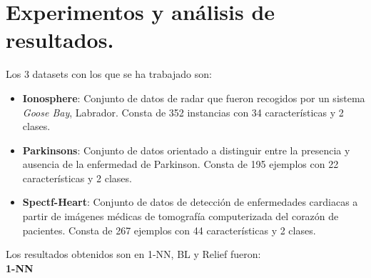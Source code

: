 \documentclass[11pt,a4paper]{article}
\theoremstyle{definition}
\begin{document}
	\section{Experimentos y análisis de resultados.}
	Los 3 datasets con los que se ha trabajado son:
	\begin{itemize}
		\item \textbf{Ionosphere}: Conjunto de datos de radar que fueron recogidos por un sistema \textit{Goose Bay}, Labrador. Consta de 352 instancias con 34 características y 2 clases.
		\item \textbf{Parkinsons}: Conjunto de datos orientado a distinguir entre la presencia y ausencia de la enfermedad de Parkinson. Consta de 195 ejemplos con 22 características y 2 clases.
		\item \textbf{Spectf-Heart}: Conjunto de datos de detección de enfermedades cardiacas a partir de imágenes médicas de tomografía computerizada del corazón de pacientes. Consta de 267 ejemplos con 44 características y 2 clases.
	\end{itemize}
	
	Los resultados obtenidos son en 1-NN, BL y Relief fueron:~\\
	
		\textbf{1-NN}
\end{document}
